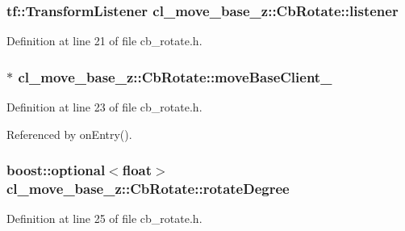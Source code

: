 \subsubsection[{\texorpdfstring{listener}{listener}}]{\setlength{\rightskip}{0pt plus 5cm}tf\+::\+Transform\+Listener cl\+\_\+move\+\_\+base\+\_\+z\+::\+Cb\+Rotate\+::listener}\hypertarget{classcl__move__base__z_1_1CbRotate_a2b57c5f392fde0a3bf38f5fd6e1bde11}{}\label{classcl__move__base__z_1_1CbRotate_a2b57c5f392fde0a3bf38f5fd6e1bde11}


Definition at line 21 of file cb\+\_\+rotate.\+h.

\subsubsection[{\texorpdfstring{move\+Base\+Client\+\_\+}{moveBaseClient_}}]{$\ast$ cl\+\_\+move\+\_\+base\+\_\+z\+::\+Cb\+Rotate\+::move\+Base\+Client\+\_\+}\hypertarget{classcl__move__base__z_1_1CbRotate_a390623f5bcbdad18fe2a65428e4621cb}{}\label{classcl__move__base__z_1_1CbRotate_a390623f5bcbdad18fe2a65428e4621cb}


Definition at line 23 of file cb\+\_\+rotate.\+h.



Referenced by on\+Entry().

\subsubsection[{\texorpdfstring{rotate\+Degree}{rotateDegree}}]{\setlength{\rightskip}{0pt plus 5cm}boost\+::optional$<$float$>$ cl\+\_\+move\+\_\+base\+\_\+z\+::\+Cb\+Rotate\+::rotate\+Degree}\hypertarget{classcl__move__base__z_1_1CbRotate_a83e9f97e917044f919c98a55d8e00db6}{}\label{classcl__move__base__z_1_1CbRotate_a83e9f97e917044f919c98a55d8e00db6}


Definition at line 25 of file cb\+\_\+rotate.\+h.



